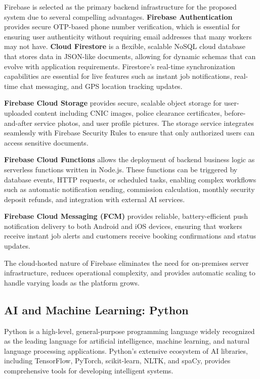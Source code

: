 \documentclass[12pt,a4paper]{report}
\begin{document}
Firebase is selected as the primary backend infrastructure for the proposed
system due to several compelling advantages. \textbf{Firebase Authentication}
provides secure OTP-based phone number verification, which is essential for
ensuring user authenticity without requiring email addresses that many workers
may not have. \textbf{Cloud Firestore} is a flexible, scalable NoSQL cloud
database that stores data in JSON-like documents, allowing for dynamic schemas
that can evolve with application requirements. Firestore's real-time
synchronization capabilities are essential for live features such as instant job
notifications, real-time chat messaging, and GPS location tracking updates.

\textbf{Firebase Cloud Storage} provides secure, scalable object storage for
user-uploaded content including CNIC images, police clearance certificates,
before-and-after service photos, and user profile pictures. The storage service
integrates seamlessly with Firebase Security Rules to ensure that only
authorized users can access sensitive documents.

\textbf{Firebase Cloud Functions} allows the deployment of backend business
logic as serverless functions written in Node.js. These functions can be
triggered by database events, HTTP requests, or scheduled tasks, enabling
complex workflows such as automatic notification sending, commission calculation,
monthly security deposit refunds, and integration with external AI services.

\textbf{Firebase Cloud Messaging (FCM)} provides reliable, battery-efficient
push notification delivery to both Android and iOS devices, ensuring that
workers receive instant job alerts and customers receive booking confirmations
and status updates.

The cloud-hosted nature of Firebase eliminates the need for on-premises server
infrastructure, reduces operational complexity, and provides automatic scaling
to handle varying loads as the platform grows.

\subsection{AI and Machine Learning: Python}
Python is a high-level, general-purpose programming language widely recognized
as the leading language for artificial intelligence, machine learning, and
natural language processing applications. Python's extensive ecosystem of AI
libraries, including TensorFlow, PyTorch, scikit-learn, NLTK, and spaCy,
provides comprehensive tools for developing intelligent systems.
\end{document}
